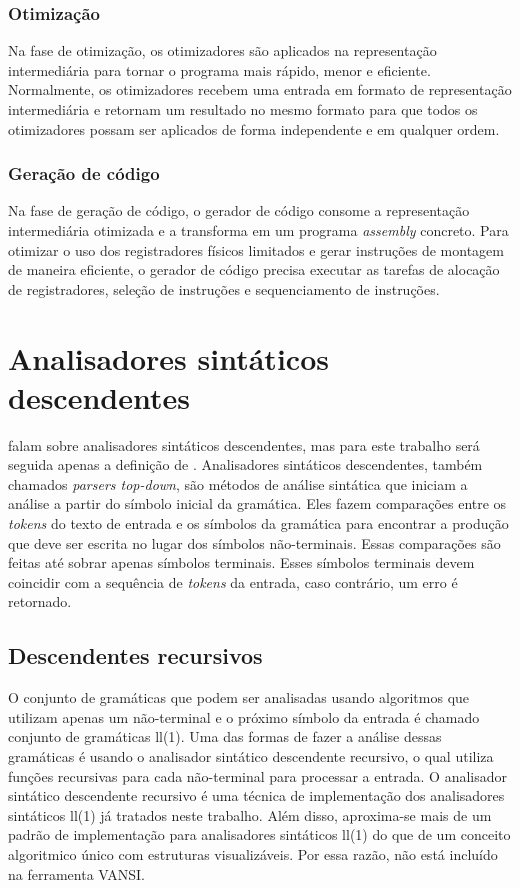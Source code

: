 \subsubsection{Otimização}
Na fase de otimização, os otimizadores são aplicados na representação intermediária para tornar o programa mais rápido, menor e eficiente. Normalmente, os otimizadores recebem uma entrada em formato de representação intermediária e retornam um resultado no mesmo formato para que todos os otimizadores possam ser aplicados de forma independente e em qualquer ordem.

\subsubsection{Geração de código}
Na fase de geração de código, o gerador de código consome a representação intermediária otimizada e a transforma em um programa \textit{assembly} concreto. Para otimizar o uso dos registradores físicos limitados e gerar instruções de montagem de maneira eficiente, o gerador de código precisa executar as tarefas de alocação de registradores, seleção de instruções e sequenciamento de instruções.


\section{Analisadores sintáticos descendentes}
\label{sec:parser-td}
\textcite{cooper2022engineering,mogensen2024introduction, thain2020introduction} falam sobre analisadores sintáticos descendentes, mas para este trabalho será seguida apenas a definição de \textcite{thain2020introduction}. Analisadores sintáticos descendentes, também chamados \textit{parsers top-down}, são métodos de análise sintática que iniciam a análise a partir do símbolo inicial da gramática. Eles fazem comparações entre os \textit{tokens} do texto de entrada e os símbolos da gramática para encontrar a produção que deve ser escrita no lugar dos símbolos não-terminais. Essas comparações são feitas até sobrar apenas símbolos terminais. Esses símbolos terminais devem coincidir com a sequência de \textit{tokens} da entrada, caso contrário, um erro é retornado.


\subsection{Descendentes recursivos}
O conjunto de gramáticas que podem ser analisadas usando algoritmos que utilizam apenas um não-terminal e o próximo símbolo da entrada é chamado conjunto de gramáticas \gls{ll}(1). Uma das formas de fazer a análise dessas gramáticas é usando o analisador sintático descendente recursivo, o qual utiliza funções recursivas para cada não-terminal para processar a entrada. O analisador sintático descendente recursivo é uma técnica de implementação dos analisadores sintáticos \gls{ll}(1) já tratados neste trabalho. Além disso, aproxima-se mais de um padrão de implementação para analisadores sintáticos \gls{ll}(1) do que de um conceito algoritmico único com estruturas visualizáveis. Por essa razão, não está incluído na ferramenta VANSI.



